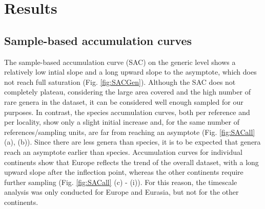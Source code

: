 \section{Results}


\subsection{Sample-based accumulation curves}
The sample-based accumulation curve (SAC) on the generic level shows a relatively low intial slope and a long upward slope to the asymptote, which does not reach full saturation (Fig. \ref{fig:SACGen}).
Although the SAC does not completely plateau, considering the large area covered and the high number of rare genera in the dataset, it can be considered well enough sampled for our purposes.
In contrast, the species accumulation curves, both per reference and per locality, show only a slight initial increase and, for the same number of references/sampling units, are far from reaching an asymptote (Fig. \ref{fig:SACall} (a), (b)).
Since there are less genera than species, it is to be expected that genera reach an asymptote earlier than species.
Accumulation curves for individual continents show that Europe reflects the trend of the overall dataset, with a long upward slope after the inflection point, whereas the other continents require further sampling (Fig. \ref{fig:SACall} (c) - (i)). For this reason, the timescale analysis was only conducted for Europe and Eurasia, but not for the other continents.


